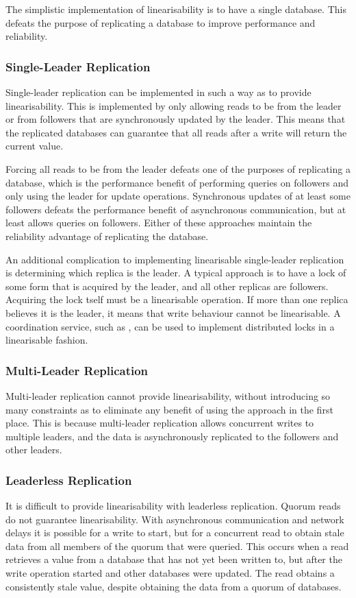 The simplistic implementation of linearisability is to have a single database.
This defeats the purpose of replicating a database to improve performance and reliability.

\subsubsection{Single-Leader Replication}
Single-leader replication can be implemented in such a way as to provide linearisability.
This is implemented by only allowing reads to be from the leader or from followers that are synchronously updated by the leader.
This means that the replicated databases can guarantee that all reads after a write will return the current value.

Forcing all reads to be from the leader defeats one of the purposes of replicating a database,
which is the performance benefit of performing queries on followers and only using the leader for update operations.
Synchronous updates of at least some followers defeats the performance benefit of asynchronous communication,
but at least allows queries on followers.
Either of these approaches maintain the reliability advantage of replicating the database.

An additional complication to implementing linearisable single-leader replication is determining which replica is the leader.
A typical approach is to have a lock of some form that is acquired by the leader, and all other replicas are followers.
Acquiring the lock tself must be a linearisable operation.
If more than one replica believes it is the leader, it means that write behaviour cannot be linearisable.
A coordination service, such as , can be used to implement distributed locks in a linearisable fashion.

\subsubsection{Multi-Leader Replication}
Multi-leader replication cannot provide linearisability,
without introducing so many constraints as to eliminate any benefit of using the approach in the first place.
This is because multi-leader replication allows concurrent writes to multiple leaders,
and the data is asynchronously replicated to the followers and other leaders.

\subsubsection{Leaderless Replication}
It is difficult to provide linearisability with leaderless replication.
Quorum reads \cite{distributed2-notes} do not guarantee linearisability.
With asynchronous communication and network delays it is possible for a write to start,
but for a concurrent read to obtain stale data from all members of the quorum that were queried.
This occurs when a read retrieves a value from a database that has not yet been written to,
but after the write operation started and other databases were updated.
The read obtains a consistently stale value, despite obtaining the data from a quorum of databases.

